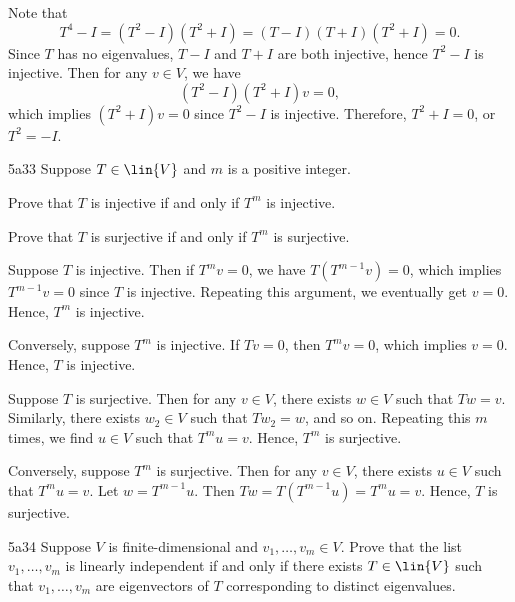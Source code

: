 \begin{sol}
    Note that
    \[
    	T^4 - I = (T^2 - I)(T^2 + I) = (T - I)(T + I)(T^2 + I) = 0.
    \]
    Since $T$ has no eigenvalues, $T - I$ and $T + I$ are both injective, hence $T^2 - I$ is injective.
    Then for any $v \in V$, we have
    \[
    	(T^2 - I)(T^2 + I)v = 0,
    \]
    which implies $(T^2 + I)v = 0$ since $T^2 - I$ is injective.
    Therefore, $T^2 + I = 0$, or $T^2 = -I$.
\end{sol}

\begin{exercise}{5a33}
    Suppose $T \in \lin{V}$ and $m$ is a positive integer.
    \begin{subexercises}
        \item Prove that $T$ is injective if and only if $T^m$ is injective.
        \item Prove that $T$ is surjective if and only if $T^m$ is surjective.
    \end{subexercises}
\end{exercise}

\begin{solenum}
    \item Suppose $T$ is injective.
	Then if $T^m v = 0$, we have $T(T^{m-1}v) = 0$, which implies $T^{m-1}v = 0$ since $T$ is injective.
	Repeating this argument, we eventually get $v = 0$.
	Hence, $T^m$ is injective.

    Conversely, suppose $T^m$ is injective.
	If $Tv = 0$, then $T^m v = 0$, which implies $v = 0$.
	Hence, $T$ is injective.

    \item Suppose $T$ is surjective.
	Then for any $v \in V$, there exists $w \in V$ such that $Tw = v$.
	Similarly, there exists $w_2 \in V$ such that $Tw_2 = w$, and so on.
	Repeating this $m$ times, we find $u \in V$ such that $T^m u = v$.
	Hence, $T^m$ is surjective.

    Conversely, suppose $T^m$ is surjective.
	Then for any $v \in V$, there exists $u \in V$ such that $T^m u = v$.
	Let $w = T^{m-1} u$.
	Then $Tw = T(T^{m-1} u) = T^m u = v$.
	Hence, $T$ is surjective.
\end{solenum}

\begin{exercise}{5a34}
    Suppose $V$ is finite-dimensional and $v_1, \ldots, v_m \in V$.
	Prove that the list $v_1, \ldots, v_m$ is linearly independent if and only if there exists $T \in \lin{V}$ such that $v_1, \ldots, v_m$ are eigenvectors of $T$ corresponding to distinct eigenvalues.
\end{exercise}

